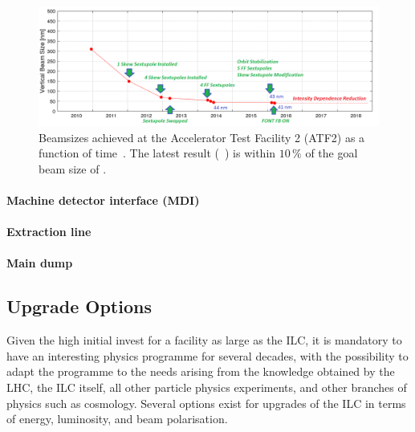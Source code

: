 \begin{figure}[htbp]
   \includegraphics[width=\hsize]{chapters/figures/ATF2trend2018}
\caption{Beamsizes achieved at the Accelerator Test Facility 2 (ATF2) as a function of time~\cite{bib:atf2esu}. The latest result (~\cite{Okugi:2017jji}) is within $10\,\%$ of the goal beam size of .}
\label{fig:atf-results}
\end{figure}

\paragraph {Machine detector interface (MDI)}



\paragraph {Extraction line}



\paragraph {Main dump}




\subsection{Upgrade Options \label{subsec:upg-opt}}

Given the high initial invest for a facility as large as the ILC, it is mandatory to have an interesting physics programme for several decades, with the possibility to adapt the programme to the needs arising from the knowledge obtained by the LHC, the ILC itself, all other particle physics experiments, and other branches of physics such as cosmology.
Several options exist for upgrades of the ILC in terms of energy, luminosity, and beam polarisation.

